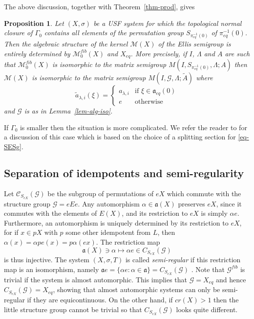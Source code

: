 \documentclass[10pt,a4paper]{amsart}
\newtheorem{prop}[theorem]{Proposition}
\numberwithin{equation}{section}
\newcommand{\Cc}{{\mathcal C}}
\newcommand{\Gg}{{\mathcal G}}
\newcommand{\Xe}{X_{eq}}
\newcommand{\aut}{{\mathfrak a}}
\newcommand{\aute}{\aut_{eq}}
\newcommand{\pe}{\pi_{eq}}
\newcommand{\M}{\mathcal M}
\begin{document}
 The above discussion,  together with Theorem~\ref{thm-prod}, gives
\begin{prop}\label{prop-alg-kernel}
Let $(X,\sigma)$ be a  USF system for which the topological  normal closure of $\Gamma_0$ contains all elements of the permutation group $S_{\pe^{-1}(0)}$ of $\pe^{-1}(0)$. Then the algebraic structure of the kernel $\M(X)$ of the Ellis semigroup is entirely determined by $\M_0^{fib}(X)$ and $\Xe$. More precisely, if $I$, $\Lambda$ and $A$ are such that 
$\M_0^{fib}(X)$ is isomorphic to the matrix semigroup $M(I,S_{\pe^{-1}(0)},\Lambda;A)$ then  $\M(X)$ is isomorphic to the matrix semigroup $M(I,\Gg,\Lambda;\tilde A)$ where 
$$\tilde a_{\lambda,i}(\xi) = \left\{\begin{array}{ll}
a_{\lambda,i} & \mbox{if } \xi \in \aute(0)\\
e & \mbox{otherwise}
\end{array}\right.$$
and $\Gg$ is as in Lemma~\ref{lem-alg-iso}.
\end{prop}


If $\Gamma_0$ is smaller then the situation is more complicated. We refer the reader to \cite{ESBS} for a discussion of this case which is based on the choice of a splitting section for \eqref{eq-SESg}.

\subsection{Separation of idempotents and semi-regularity}
Let $\Cc_{S_{eX}}(\Gg)$ be the subgroup of permutations of $eX$ which commute with the structure group $\Gg=eEe$. Any automorphism $\alpha\in\aut(X)$ preserves $eX$, since it commutes with the elements of $E(X)$, and its restriction to $eX$ is simply $\alpha e$. Furthermore, an automorphism is uniquely determined by its restriction to $eX$, for if $x\in pX$ with $p$ some other idempotent from $L$, then $\alpha(x) = \alpha p e(x) = p\alpha(ex)$. The restriction map 
$$\aut(X)\ni \alpha\mapsto\alpha e\in C_{S_{eX}}(\Gg)$$ is thus injective. 
The system  $(X,\sigma,T)$ is called {\em semi-regular}  if this restriction map is an isomorphism, namely $\aut e =\{\alpha e:\alpha\in\aut\}= C_{S_{eX}}(\Gg)$ \cite{Auslander-Glasner,ESBS}. 
Note that $\Gg^{fib}$ is trivial if the system is almost automorphic. This implies that $\Gg = \Xe$ and hence $C_{S_{eX}}(\Gg)=\Xe$, showing that almost automorphic systems can only be semi-regular if they are equicontinuous. 
On the other hand, if $cr(X)>1$ then the little structure group cannot be trivial \cite{K25} so that  $C_{S_{eX}}(\Gg)$ looks quite different. 
\end{document}
